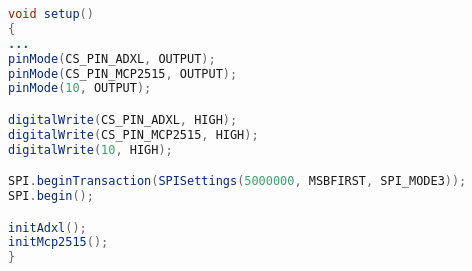 \label{lst:mcpExecutorSetup}
\begin{lstlisting}[language=Java, caption=Setup Routine]
void setup()
{
...
pinMode(CS_PIN_ADXL, OUTPUT);
pinMode(CS_PIN_MCP2515, OUTPUT);
pinMode(10, OUTPUT);

digitalWrite(CS_PIN_ADXL, HIGH);
digitalWrite(CS_PIN_MCP2515, HIGH);
digitalWrite(10, HIGH);

SPI.beginTransaction(SPISettings(5000000, MSBFIRST, SPI_MODE3));
SPI.begin();

initAdxl();
initMcp2515();
}
\end{lstlisting}
